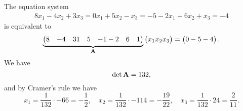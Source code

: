 \documentclass[hyperref, a4paper]{article}
\def\\{}%
\newcommand*{\mat}[1]{\vb{#1}}
\begin{document}
\section{}

The equation system 
\begin{equation}
    \begin{gathered}
        8 x_1-4 x_2+3 x_3=0 \\
        x_1+5 x_2-x_3=-5 \\
        -2 x_1+6 x_2+x_3=-4
        \end{gathered}
\end{equation}
is equivalent to 
\begin{equation}
    \underbrace{\pmqty{
        8 & - 4 & 3 \\
        1 & 5 & -1 \\
        -2 & 6 & 1
    }}_{\mat{A}} \pmqty{x_1 \\ x_2 \\ x_3} 
    = \pmqty{0 \\ -5 \\ -4}.
\end{equation}
We have 
\begin{equation}
    \det \mat{A} = 132, 
\end{equation}
and by Cramer's rule we have 
\begin{equation}
    x_1 = \frac{1}{132} \cdot -66 = - \frac{1}{2}, \quad 
    x_2 = \frac{1}{132} \cdot -114 = - \frac{19}{22}, \quad 
    x_3 = \frac{1}{132} \cdot 24 = \frac{2}{11}.
\end{equation}

\section{}
\end{document}
